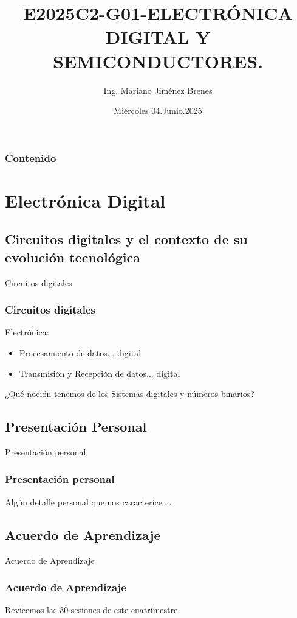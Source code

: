 \documentclass[11pt]{beamer}
\author{Ing. Mariano Jim\'enez Brenes}
\title
{
E2025C2-G01-ELECTRÓNICA DIGITAL Y SEMICONDUCTORES.
}
\institute{
Universidad Castro Carazo\linebreak
T\'ecnico En Semiconductores
}
\date{Mi\'ercoles 04.Junio.2025}
\begin{document}
\begin{frame}
\maketitle 
\end{frame}

\logo{}

\begin{frame}
\frametitle{Contenido}
\tableofcontents
\end{frame}


\section{Electr\'onica Digital}
\subsection{Circuitos digitales y el
contexto de su evoluci\'on
tecnol\'ogica}
\begin{frame}{Circuitos digitales}
\frametitle{Circuitos digitales}
Electr\'onica:
	\begin{itemize}
		\item Procesamiento de datos... digital
		\item Transmisi\'on y Recepci\'on de datos... digital
	\end{itemize}
	¿Qu\'e noci\'on tenemos de los Sistemas digitales y n\'umeros binarios?
\end{frame}
\subsection{Presentaci\'on Personal}
\begin{frame}{Presentaci\'on personal}
\frametitle{Presentaci\'on personal}
Alg\'un detalle personal que nos caracterice....
\end{frame}
\subsection{Acuerdo de Aprendizaje}
\begin{frame}{Acuerdo de Aprendizaje}
\frametitle{Acuerdo de Aprendizaje}
Revicemos las 30 sesiones de este cuatrimestre
\end{frame}
\end{document}

